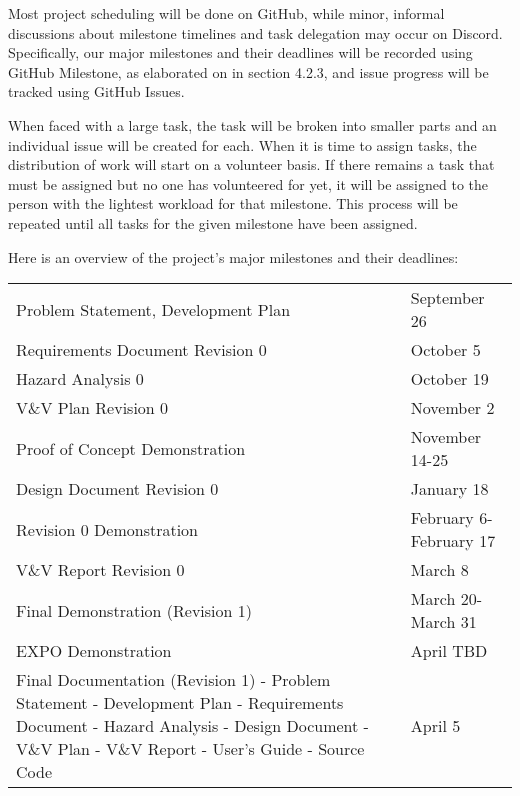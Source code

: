 \documentclass{article}
\begin{document}
Most project scheduling will be done on GitHub, while minor, informal discussions about milestone timelines and task delegation may occur on Discord. Specifically, our major milestones and their deadlines will be recorded using GitHub Milestone, as elaborated on in section 4.2.3, and issue progress will be tracked using GitHub Issues.

When faced with a large task, the task will be broken into smaller parts and an individual issue will be created for each. When it is time to assign tasks, the distribution of work will start on a volunteer basis. If there remains a task that must be assigned but no one has volunteered for yet, it will be assigned to the person with the lightest workload for that milestone. This process will be repeated until all tasks for the given milestone have been assigned.

Here is an overview of the project's major milestones and their deadlines:

\noindent \begin{tabular}{ p{6.7cm} l}
   Problem Statement, Development Plan & September 26 \\
   Requirements Document Revision 0 & October 5 \\
   Hazard Analysis 0 & October 19 \\
   V\&V Plan Revision 0 & November 2 \\
   Proof of Concept Demonstration & November 14-25 \\
   Design Document Revision 0 & January 18 \\
   Revision 0 Demonstration & February 6-February 17 \\
   V\&V Report Revision 0 & March 8 \\
   Final Demonstration (Revision 1) & March 20-March 31 \\
   EXPO Demonstration & April TBD \\
   Final Documentation (Revision 1)\newline 
    - Problem Statement\newline
    - Development Plan\newline
    - Requirements Document\newline
    - Hazard Analysis\newline
    - Design Document\newline
    - V\&V Plan\newline
    - V\&V Report\newline
    - User's Guide\newline
    - Source Code\newline &  April 5 \\
\end{tabular}
\end{document}
